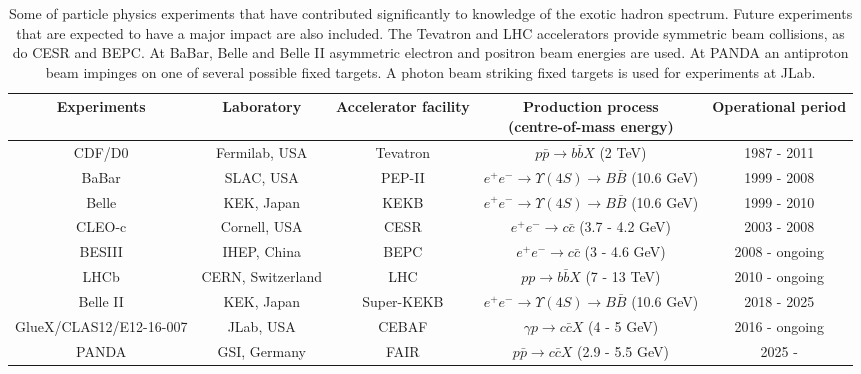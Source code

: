 \begin{landscape}
    \vspace*{\fill}   
\begin{table}[H]
    \centering
    \small
    \setlength{\tabcolsep}{3pt}
    \caption{Some of particle physics experiments that have contributed significantly to knowledge of the exotic hadron spectrum. Future experiments that are expected to have a major impact are also included. The Tevatron and LHC accelerators provide symmetric beam collisions, as do CESR and BEPC. At BaBar, Belle and Belle II asymmetric electron and positron beam energies are used. At PANDA an antiproton beam impinges on one of several possible fixed targets. A photon beam striking fixed targets is used for experiments at JLab.}
    \label{tab.1.3}
    \begin{tabular}{ccccc}
        \hline
        Experiments & Laboratory & Accelerator facility & \pbox{20cm}{Production process\\(centre-of-mass energy)} & Operational period \\
        \hline
        CDF/D0 & Fermilab, USA & Tevatron & $p\bar{p} \rightarrow b\bar{b}X$ (2 TeV) & 1987 - 2011 \\
        BaBar & SLAC, USA & PEP-II & $e^{+}e^{-} \rightarrow \Upsilon(4S) \rightarrow B\bar{B}$ (10.6 GeV) & 1999 - 2008 \\
        Belle & KEK, Japan & KEKB & $e^{+}e^{-} \rightarrow \Upsilon(4S) \rightarrow B\bar{B}$ (10.6 GeV) & 1999 - 2010 \\
        CLEO-c & Cornell, USA & CESR & $e^{+}e^{-} \rightarrow c\bar{c}$ (3.7 - 4.2 GeV) & 2003 - 2008 \\
        BESIII & IHEP, China & BEPC & $e^{+}e^{-} \rightarrow  c\bar{c}$ (3 - 4.6 GeV) & 2008 - ongoing \\
        LHCb & CERN, Switzerland & LHC & $pp \rightarrow b\bar{b}X$ (7 - 13 TeV) & 2010 - ongoing \\
        Belle II & KEK, Japan & Super-KEKB & $e^{+}e^{-} \rightarrow \Upsilon(4S) \rightarrow B\bar{B}$ (10.6 GeV) & 2018 - 2025 \\
        GlueX/CLAS12/E12-16-007 & JLab, USA & CEBAF & $\gamma p \rightarrow c\bar{c} X$ (4 - 5 GeV) & 2016 - ongoing \\
        PANDA & GSI, Germany & FAIR & $p\bar{p} \rightarrow c\bar{c} X$ (2.9 - 5.5 GeV) & 2025 -  \\
        \hline
    \end{tabular}
\end{table}
\vspace*{\fill}
\end{landscape}

